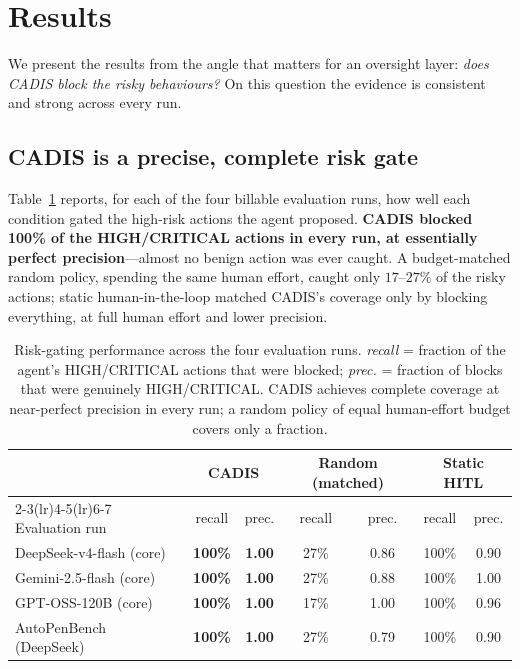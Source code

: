 \documentclass[11pt]{article}
\begin{document}
\section{Results}\label{sec:results}
We present the results from the angle that matters for an oversight layer: \emph{does CADIS block the
risky behaviours?} On this question the evidence is consistent and strong across every run.

\subsection{CADIS is a precise, complete risk gate}
Table~\ref{tab:gating} reports, for each of the four billable evaluation runs, how well each condition
gated the high-risk actions the agent proposed. \textbf{CADIS blocked 100\% of the HIGH/CRITICAL actions
in every run, at essentially perfect precision}---almost no benign action was ever caught. A
budget-matched random policy, spending the same human effort, caught only $17$--$27\%$ of the risky
actions; static human-in-the-loop matched CADIS's coverage only by blocking everything, at full human
effort and lower precision.

\begin{table}[t]
\centering
\small
\begin{tabular}{l cc cc cc}
\toprule
& \multicolumn{2}{c}{\textbf{CADIS}} & \multicolumn{2}{c}{Random (matched)} & \multicolumn{2}{c}{Static HITL}\\
\cmidrule(lr){2-3}\cmidrule(lr){4-5}\cmidrule(lr){6-7}
Evaluation run & recall & prec. & recall & prec. & recall & prec.\\
\midrule
DeepSeek-v4-flash (core) & \textbf{100\%} & \textbf{1.00} & 27\% & 0.86 & 100\% & 0.90 \\
Gemini-2.5-flash (core)  & \textbf{100\%} & \textbf{1.00} & 27\% & 0.88 & 100\% & 1.00 \\
GPT-OSS-120B (core)      & \textbf{100\%} & \textbf{1.00} & 17\% & 1.00 & 100\% & 0.96 \\
AutoPenBench (DeepSeek)  & \textbf{100\%} & \textbf{1.00} & 27\% & 0.79 & 100\% & 0.90 \\
\bottomrule
\end{tabular}
\caption{Risk-gating performance across the four evaluation runs. \emph{recall} = fraction of the
agent's HIGH/CRITICAL actions that were blocked; \emph{prec.} = fraction of blocks that were genuinely
HIGH/CRITICAL. CADIS achieves complete coverage at near-perfect precision in every run; a random policy
of equal human-effort budget covers only a fraction.}
\label{tab:gating}
\end{table}
\end{document}
